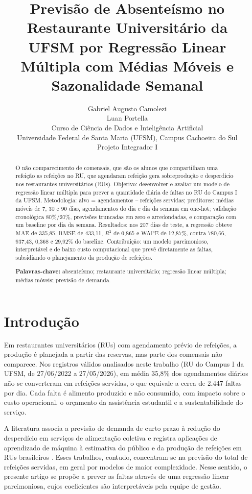 \documentclass[11pt]{article}
\title{\large Previsão de Absenteísmo no
Restaurante Universitário da UFSM
por Regressão Linear Múltipla
com Médias Móveis e Sazonalidade Semanal}
\author{Gabriel Augusto Camolezi\\
Luan Portella\\
\small Curso de Ciência de Dados e Inteligência Artificial\\
\small Universidade Federal de Santa Maria (UFSM), Campus Cachoeira do Sul\\
\small Projeto Integrador I}
\date{}
\begin{document}
\maketitle

\begin{abstract}
O não comparecimento de comensais, que são os alunos que compartilham uma refeição as refeições no RU, que agendaram refeição gera sobreprodução e desperdício nos restaurantes universitários (RUs). Objetivo: desenvolver e avaliar um modelo de regressão linear múltipla para prever a quantidade diária de faltas no RU do Campus I da UFSM. Metodologia: alvo = agendamentos -- refeições servidas; preditores: médias móveis de 7, 30 e 90 dias, agendamentos do dia e dia da semana em one-hot; validação cronológica 80\%/20\%, previsões truncadas em zero e arredondadas, e comparação com um baseline por dia da semana. Resultados: nos 207 dias de teste, a regressão obteve MAE de 335,85, RMSE de 433,11, $R^2$ de 0,865 e WAPE de 12,87\%, contra 780,66, 937,43, 0,368 e 29,92\% do baseline. Contribuição: um modelo parcimonioso, interpretável e de baixo custo computacional que prevê diretamente as faltas, subsidiando o planejamento da produção de refeições.

\textbf{Palavras-chave:} absenteísmo; restaurante universitário; regressão linear múltipla; médias móveis; previsão de demanda.
\end{abstract}

\section{Introdução}

Em restaurantes universitários (RUs) com agendamento prévio de refeições, a produção é planejada a partir das reservas, mas parte dos comensais não comparece. Nos registros válidos analisados neste trabalho (RU do Campus I da UFSM, de 27/06/2022 a 27/05/2026), em média 35,8\% dos agendamentos diários não se converteram em refeições servidas, o que equivale a cerca de 2.447 faltas por dia. Cada falta é alimento produzido e não consumido, com impacto sobre o custo operacional, o orçamento da assistência estudantil e a sustentabilidade do serviço.

A literatura associa a previsão de demanda de curto prazo à redução do desperdício em serviços de alimentação coletiva \citep{rodrigues2024machine} e registra aplicações de aprendizado de máquina à estimativa do público e da produção de refeições em RUs brasileiros \citep{rocha2011utilizaccao,de2021metodo}. Esses trabalhos, contudo, concentram-se na previsão do total de refeições servidas, em geral por modelos de maior complexidade. Nesse sentido, o presente artigo se propõe a prever as faltas através de uma regressão linear parcimoniosa, cujos coeficientes são interpretáveis pela equipe de gestão.
\end{document}
